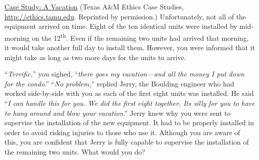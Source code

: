 \begin{enumerate}
\begin{example}{
\ul{Case Study: A Vacation} (Texas A\&M Ethics Case Studies,
\url{http://ethics.tamu.edu}. Reprinted by permission.)}
Unfortunately, not all of the equipment arrived on time. Eight of the
ten identical units were installed by mid-morning on the
12\textsuperscript{th}. Even if the remaining two units had arrived that
morning, it would take another full day to install them. However, you
were informed that it might take as long as two more days for the units
to arrive.

``\emph{Terrific,}'' you sighed, ``\emph{there goes my vacation---and
all the money I put down for the condo}.'' ``\emph{No problem},''
replied Jerry, the Boulding engineer who had worked side-by-side with
you as each of the first eight units was installed. He said ``\emph{I
can handle this for you. We did the first eight together.
It\textquotesingle s silly for you to have to hang around and blow your
vacation}.'' Jerry knew why you were sent to supervise the installation
of the new equipment. It had to be properly installed in order to avoid
risking injuries to those who use it. Although you are aware of this,
you are confident that Jerry is fully capable to supervise the
installation of the remaining two units. What would you do?
\end{example}

\end{enumerate}